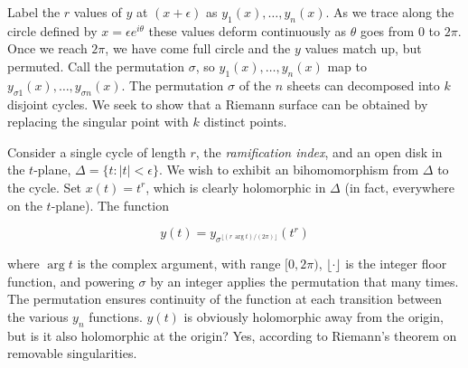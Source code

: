 Label the $r$ values of $y$ at $(x+\epsilon)$
as $y_1(x),\ldots,y_n(x)$.  As we trace along the circle
defined by $x=\epsilon e^{i\theta}$ these values
deform continuously as $\theta$ goes from $0$ to $2\pi$.
Once we reach $2\pi$, we have come full circle
and the $y$ values match up, but permuted.
Call the permutation $\sigma$,
so $y_1(x),\ldots,y_n(x)$ map to $y_{\sigma 1}(x),\ldots,y_{\sigma n}(x)$.
The permutation $\sigma$ of the $n$
sheets can decomposed into $k$ disjoint cycles.  We seek to
show that a Riemann surface can be obtained by replacing the singular
point with $k$ distinct points.

Consider a single cycle of length $r$, the {\it ramification index},
and an open disk in the $t$-plane, $\Delta=\{t:|t|<\epsilon\}$.
We wish to exhibit an bihomomorphism from $\Delta$ to the
cycle.  Set $x(t)=t^r$, which is clearly holomorphic in $\Delta$
(in fact, everywhere on the $t$-plane).  The function

$$y(t) = y_{\sigma^{\lfloor (r \, \arg t)/(2 \pi) \rfloor}}(t^r)$$

where $\arg t$ is the complex argument, with range $[0, 2\pi)$,
$\lfloor \cdot \rfloor$ is the integer floor function, and powering
$\sigma$ by an integer applies the permutation that many times.  The
permutation ensures continuity of the function at each transition
between the various $y_n$ functions.  $y(t)$ is obviously holomorphic
away from the origin, but is it also holomorphic at the origin?  Yes,
according to Riemann's theorem on removable singularities.






